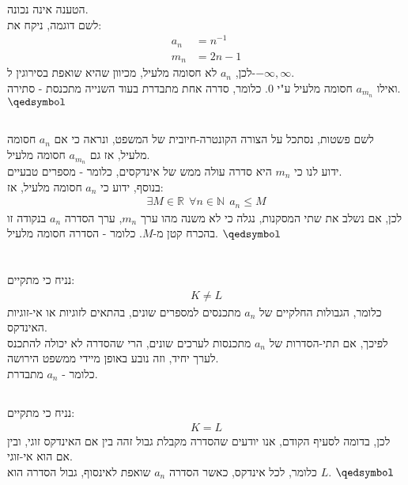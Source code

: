 \documentclass[a4paper, 12pt, leqno]{article}
\newcommand{\sub}[1]{\subsection{\underline{#1}}}
\newcommand{\RR}{\mathbb{R}}
\newcommand{\N}{\ensuremath{\mathbb{N}}}
\newcommand{\eq}[1]{\begin{align*}#1\end{align*}}
\renewcommand{\qed}{\hfill\(\qedsymbol\)}
\renewcommand{\leq}{\leqslant}
\begin{document}
\section{}
\sub{}
הטענה אינה נכונה.\\
לשם דוגמה, ניקח את:
\eq{
    a_n&=n^{-1}\\
    m_n&=2n-1
}
לכן, $a_n$ לא חסומה מלעיל, מכיוון שהיא שואפת בסירוגין ל-$-\infty,\infty$.\\
ואילו $a_{m_n}$ חסומה מלעיל ע"י $0$.
כלומר, סדרה אחת מתבדרת בעוד השנייה מתכנסת - סתירה.
\qed
\sub{}
לשם פשטות, נסתכל על הצורה הקונטרה-חיובית של המשפט, ונראה כי אם $a_n$ חסומה מלעיל, אז גם $a_{m_n}$ חסומה מלעיל.\\
ידוע לנו כי $m_n$ היא סדרה עולה ממש של אינדקסים, כלומר - מספרים טבעיים.\\
בנוסף, ידוע כי $a_n$ חסומה מלעיל, אז:
\eq{
    \exists{M}\in\RR~~\forall{n}\in\N~~a_n\leq{M}
}
לכן, אם נשלב את שתי המסקנות, נגלה כי לא משנה מהו ערך $m_n$, ערך הסדרה $a_n$ בנקודה זו בהכרח קטן מ-$M$.
כלומר - הסדרה חסומה מלעיל.
\qed

\section{}
\sub{}
נניח כי מתקיים:
\eq{
    K\neq{L}
}
כלומר, הגבולות החלקיים של $a_n$ מתכנסים למספרים שונים, בהתאים לזוגיות או אי-זוגיות האינדקס.\\
לפיכך, אם תתי-הסדרות של $a_n$ מתכנסות לערכים שונים, הרי שהסדרה לא יכולה להתכנס לערך יחיד, וזה נובע באופן מיידי ממשפט הירושה.\\
כלומר - $a_n$ מתבדרת.
\sub{}
נניח כי מתקיים:
\eq{
    K={L}
}
לכן, בדומה לסעיף הקודם, אנו יודעים שהסדרה מקבלת גבול זהה בין אם האינדקס זוגי, ובין אם הוא אי-זוגי.\\
כלומר, לכל אינדקס, כאשר הסדרה $a_n$ שואפת לאינסוף, גבול הסדרה הוא $L$.
\qed

\pagebreak
\end{document}
